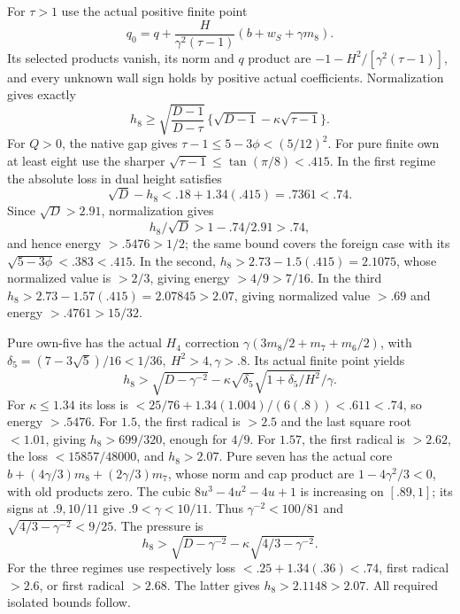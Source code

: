 \documentclass[11pt]{article}
\theoremstyle{definition}
\theoremstyle{remark}
\begin{document}
For \(\tau>1\) use the actual positive finite point
\[
 q_0=q+\frac{H}{\gamma^2(\tau-1)}(b+w_S+\gamma m_8).
\]
Its selected products vanish, its norm and \(q\) product are
\(-1-H^2/[\gamma^2(\tau-1)]\), and every unknown wall sign
holds by positive actual coefficients.
Normalization gives exactly
\[
 h_8\geq\sqrt{\frac{D-1}{D-\tau}}\,
          \{\sqrt{D-1}-\kappa\sqrt{\tau-1}\}.
\]
For \(Q>0\), the native gap gives
\(\tau-1\leq5-3\phi<(5/12)^2\).
For pure finite own at least eight use the sharper
\(\sqrt{\tau-1}\leq\tan(\pi/8)<.415\).
In the first regime the absolute loss in dual height satisfies
\[
 \sqrt D-h_8<.18+1.34(.415)=.7361<.74 .
\]
Since \(\sqrt D>2.91\), normalization gives
\[
 h_8/\sqrt D>1-.74/2.91>.74,
\]
and hence energy \(>.5476>1/2\);
the same bound covers the foreign case with its
\(\sqrt{5-3\phi}<.383<.415\).
In the second, \(h_8>2.73-1.5(.415)=2.1075\), whose normalized
value is \(>2/3\), giving energy \(>4/9>7/16\).
In the third \(h_8>2.73-1.57(.415)=2.07845>2.07\),
giving normalized value \(>.69\) and energy \(>.4761>15/32\).

Pure own-five has the actual \(H_4\) correction
\(\gamma(3m_8/2+m_7+m_6/2)\), with
\(\delta_5=(7-3\sqrt5)/16<1/36,\ H^2>4,\gamma>.8\).
Its actual finite point yields
\[
 h_8>\sqrt{D-\gamma^{-2}}-
       \kappa\sqrt{\delta_5}\sqrt{1+\delta_5/H^2}/\gamma .
\]
For \(\kappa\leq1.34\) its loss is
\(<25/76+1.34(1.004)/(6(.8))<.611<.74\),
so energy \(>.5476\).
For \(1.5\), the first radical is \(>2.5\) and the last square
root \(<1.01\), giving \(h_8>699/320\), enough for \(4/9\).
For \(1.57\), the first radical is \(>2.62\), the loss
\(<15857/48000\), and \(h_8>2.07\).
Pure seven has the actual core
\(b+(4\gamma/3)m_8+(2\gamma/3)m_7\), whose norm and cap
product are \(1-4\gamma^2/3<0\), with old products zero.
The cubic \(8u^3-4u^2-4u+1\) is increasing on \([.89,1]\);
its signs at \(.9,10/11\) give \(.9<\gamma<10/11\).
Thus \(\gamma^{-2}<100/81\) and
\(\sqrt{4/3-\gamma^{-2}}<9/25\). The pressure is
\[
 h_8>\sqrt{D-\gamma^{-2}}-\kappa\sqrt{4/3-\gamma^{-2}}.
\]
For the three regimes use respectively loss \(<.25+1.34(.36)<.74\),
first radical \(>2.6\), or first radical \(>2.68\).
The latter gives \(h_8>2.1148>2.07\).
All required isolated bounds follow.
\end{document}
